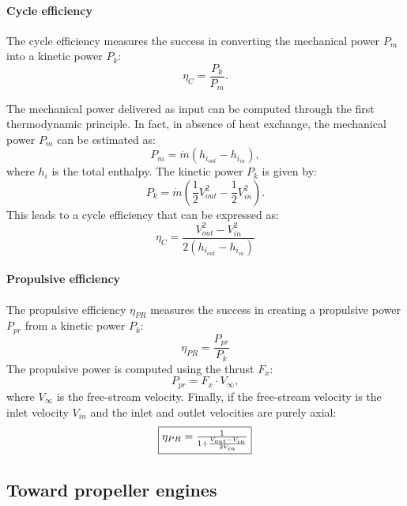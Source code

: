 \paragraph{Cycle efficiency}
The cycle efficiency measures the success in converting the mechanical
power $P_m$ into a kinetic power $P_k$:
\begin{equation}
	\eta_C = \frac{P_k}{P_m}.
\end{equation}

The mechanical power delivered as input
can be computed through the first thermodynamic principle. In fact, in absence
of heat exchange, the mechanical power $P_m$ can be estimated as:
\begin{equation}
	P_m = \dot{m} (h_{i_{out}} - h_{i_{in}}),
\end{equation}
where $h_i$ is the total enthalpy.
The kinetic power $P_k$ is given by:
\begin{equation}
	P_k = \dot{m} \left(\frac{1}{2} V^2_{out} -
	\frac{1}{2} V^2_{in} \right).
\end{equation}
This leads to a cycle efficiency that can be expressed as:
\begin{equation}
	\eta_{C} = \frac{V^2_{out} - V^2_{in}}{2 (h_{i_{out}} - h_{i_{in}})}
\end{equation}

\paragraph{Propulsive efficiency}
The propulsive efficiency $\eta_{PR}$ measures the success
in creating a propulsive power $P_{pr}$ from a
kinetic power $P_k$:
\begin{equation}
	\eta_{PR} = \frac{P_{pr}}{P_k}
\end{equation}
The propulsive power is computed using the thrust $F_x$:
\begin{equation}
	P_{pr} = F_x \cdot V_{\infty},
\end{equation}
where $V_{\infty}$ is the free-stream velocity.
Finally, if the free-stream velocity is the inlet velocity $V_{in}$
and the inlet and outlet velocities are purely axial:
\begin{equation}
	\fbox{$
	\eta_{PR} = \frac{1}{1 + \frac{V_{out} - V_{in}}{2 V_{in}}}
	$}
	\label{eq:cror_propulsive_efficiency}
\end{equation}

\subsection{Toward propeller engines}
\label{sub:cror_toward_propeller}

